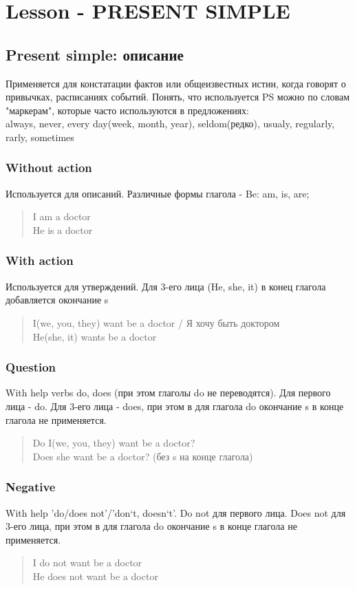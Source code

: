 \section{Lesson - PRESENT SIMPLE}

 \subsection{Present simple: описание}
 Применяется для констатации фактов или общеизвестных истин, когда говорят о привычках, расписаниях событий. Понять, что используется PS  можно по словам "маркерам", которые часто используются в предложениях:\\
 always, never, every day(week, month, year), seldom(редко), usualy, regularly, rarly, sometimes
 


 \subsubsection{Without action}
 Используется для описаний. Различные формы глагола - Be: am, is, are;
	\begin{quote}
		I am a doctor\\
		He is a doctor
	\end{quote}
\subsubsection{With action} 
 Используется для утверждений. Для 3-его лица (He, she, it) в конец глагола добавляется окончание s
 \begin{quote}
 	I(we, you, they) want be a doctor / Я хочу быть доктором\\
 	He(she, it) wants be a doctor	
 \end{quote}
 
 \subsubsection{Question} 
 With  help verbs do, does (при этом глаголы do не переводятся). Для первого лица - do. Для 3-его лица - does, при этом в для глагола do окончание s в конце глагола не применяется.
  \begin{quote}
 Do I(we, you, they) want be a doctor?\\
 Does she want be a doctor? (без s на конце глагола)
 \end{quote}

 \subsubsection{Negative} 
 With help 'do/does not'/'don`t, doesn`t'. Do not для первого лица. Does not  для 3-его лица, при этом в для глагола do окончание s в конце глагола не применяется.
   \begin{quote}
 	I do not want be a doctor\\
 	He does not want be a doctor
 \end{quote}

